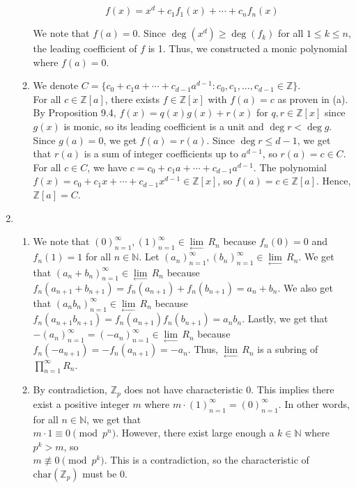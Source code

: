 \documentclass{article}
\begin{document}
\begin{enumerate}
\begin{enumerate}
    $$f(x) = x^d + c_1f_1(x) + \cdots + c_n f_n(x)$$ 

    We note that $f(a) = 0$. Since $\deg(x^d) \geq \deg(f_k)$ for all $1 \leq k \leq n$, the leading coefficient of $f$ is 1. Thus, we constructed a monic polynomial where $f(a) = 0$. \\

    \item

    We denote $C=\{c_0+c_1a+\cdots+c_{d-1}a^{d-1}:c_0,c_1,\dots,c_{d-1}\in\mathbb{Z}\}$.\\

    For all $c\in\mathbb{Z}[a]$, there exists $f\in\mathbb{Z}[x]$ with $f(a)=c$ as proven in (a). By Proposition 9.4, $f(x)=q(x)g(x)+r(x)$ for $q,r\in\mathbb{Z}[x]$ since $g(x)$ is monic, so its leading coefficient is a unit and $\deg r<\deg g$. Since $g(a)=0$, we get $f(a)=r(a)$. Since $\deg r\le d-1$, we get that $r(a)$ is a sum of integer coefficients up to $a^{d-1}$, so $r(a)=c\in C$.\\

    For all $c\in C$, we have $c=c_0+c_1a+\cdots+c_{d-1}a^{d-1}$. The polynomial $f(x)=c_0+c_1x+\cdots+c_{d-1}x^{d-1}\in\mathbb{Z}[x]$, so $f(a)=c\in\mathbb{Z}[a]$. Hence, $\mathbb{Z}[a]=C$.


\end{enumerate}

\newpage 

\item 
\begin{enumerate}
    \item 
    We note that $(0)^{\infty}_{n=1}, (1)^{\infty}_{n=1}  \in \underset{\leftarrow}{\lim}\, R_n$ because $f_n(0) = 0$ and $f_n(1) = 1$ for all $n \in \mathbb{N}$. Let $(a_n)^{\infty}_{n=1}, (b_n)^{\infty}_{n=1} \in \underset{\leftarrow}{\lim}\, R_n$. We get that $(a_n + b_n)^{\infty}_{n=1} \in \underset{\leftarrow}{\lim}\, R_n$ because $f_n(a_{n+1} + b_{n+1}) = f_n(a_{n+1}) + f_n(b_{n+1}) = a_n+b_n$. We also get that $(a_n b_n)^{\infty}_{n=1} \in \underset{\leftarrow}{\lim}\, R_n$ because $f_n(a_{n+1} b_{n+1}) = f_n(a_{n+1})  f_n(b_{n+1}) = a_nb_n$.  Lastly, we get that $-(a_n)^{\infty}_{n=1} = (-a_n)^{\infty}_{n=1}  \in \underset{\leftarrow}{\lim}\, R_n$ because $f_n(-a_{n+1}) = -f_n(a_{n+1}) = -a_n$. Thus, $\underset{\leftarrow}{\lim}\, R_n$ is a subring of $\prod_{n=1}^{\infty}R_n$. \\

    \item 
    By contradiction, $\mathbb{Z}_p$ does not have characteristic 0. This implies there exist a positive integer $m$ where $m \cdot (1)^{\infty}_{n=1} = (0)^{\infty}_{n=1}$. In other words, for all $n \in \mathbb{N}$, we get that \\
    $m \cdot 1 \equiv 0 \pmod {p^n}$. However, there exist large enough a $k \in \mathbb{N}$ where $p^k > m$, so \\
    $m \not \equiv 0 \pmod {p^k}$. This is a contradiction, so the characteristic of $\text{char}(\mathbb{Z}_p)$ must be 0.  \\


\end{enumerate}
\end{enumerate}
\end{document}
